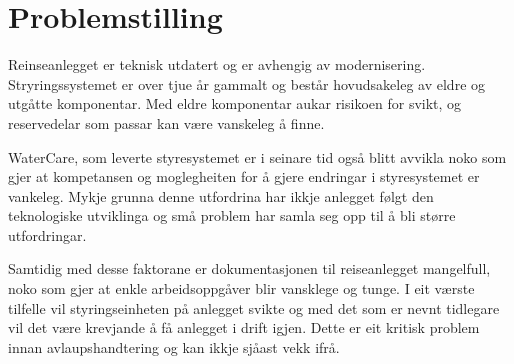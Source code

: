 \section{Problemstilling}
Reinseanlegget er teknisk utdatert og er avhengig av modernisering. Stryringssystemet er over tjue år gammalt
og består hovudsakeleg av eldre og utgåtte komponentar. Med eldre komponentar aukar risikoen for svikt, 
og reservedelar som passar kan være vanskeleg å finne.

WaterCare, som leverte styresystemet er i seinare tid også blitt avvikla noko som gjer at kompetansen 
og moglegheiten for å gjere endringar i styresystemet er vankeleg. 
Mykje grunna denne utfordrina har ikkje anlegget følgt den teknologiske utviklinga 
og små problem har samla seg opp til å bli større utfordringar.

Samtidig med desse faktorane er dokumentasjonen til reiseanlegget mangelfull, noko som gjer at enkle arbeidsoppgåver blir vansklege og tunge.
I eit værste tilfelle vil styringseinheten på anlegget svikte og med det som er nevnt tidlegare vil det være krevjande
å få anlegget i drift igjen. Dette er eit kritisk problem innan avlaupshandtering og kan ikkje sjåast vekk ifrå.
\newline



